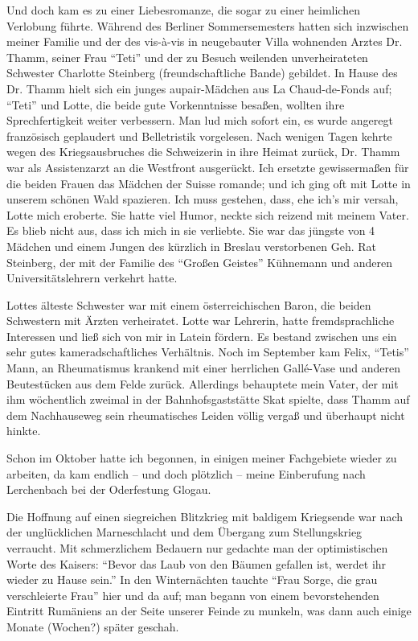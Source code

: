 \documentclass[a5paper,pagesize,10pt,twoside=true]{scrbook}
\begin{document}
Und doch kam es zu einer Liebesromanze, die sogar zu einer heimlichen Verlobung führte. Während des Berliner Sommersemesters hatten sich inzwischen meiner Familie und der des vis-à-vis in neugebauter Villa wohnenden Arztes Dr. Thamm, seiner Frau \enquote{Teti} und der zu Besuch weilenden unverheirateten Schwester Charlotte Steinberg (freundschaftliche Bande) gebildet. In Hause des Dr. Thamm hielt sich ein junges aupair-Mädchen aus La Chaud-de-Fonds auf; \enquote{Teti} und Lotte, die beide gute Vorkenntnisse besaßen, wollten ihre Sprechfertigkeit weiter verbessern. Man lud mich sofort ein, es wurde angeregt französisch geplaudert und Belletristik vorgelesen. Nach wenigen Tagen kehrte wegen des Kriegsausbruches die Schweizerin in ihre Heimat zurück, Dr. Thamm war als Assistenzarzt an die Westfront ausgerückt. Ich ersetzte gewissermaßen für die beiden Frauen das Mädchen der Suisse romande; und ich ging oft mit Lotte in unserem schönen Wald spazieren. Ich muss gestehen, dass, ehe ich's mir versah, Lotte mich eroberte. Sie hatte viel Humor, neckte sich reizend mit meinem Vater. Es blieb nicht aus, dass ich mich in sie verliebte. Sie war das jüngste von 4 Mädchen und einem Jungen des kürzlich in Breslau verstorbenen Geh. Rat Steinberg, der mit der Familie des \enquote{Großen Geistes} Kühnemann und anderen Universitätslehrern verkehrt hatte.

Lottes älteste Schwester war mit einem österreichischen Baron, die beiden Schwestern mit Ärzten verheiratet. Lotte war Lehrerin, hatte fremdsprachliche Interessen und ließ sich von mir in Latein fördern. Es bestand zwischen uns ein sehr gutes kameradschaftliches Verhältnis. Noch im September kam Felix, \enquote{Tetis} Mann, an Rheumatismus krankend mit einer herrlichen Gallé-Vase und anderen Beutestücken aus dem Felde zurück. Allerdings behauptete mein Vater, der mit ihm wöchentlich zweimal in der Bahnhofsgaststätte Skat spielte, dass Thamm auf dem Nachhauseweg sein rheumatisches Leiden völlig vergaß und überhaupt nicht hinkte.

Schon im Oktober hatte ich begonnen, in einigen meiner Fachgebiete wieder zu arbeiten, da kam endlich -- und doch plötzlich -- meine Einberufung nach Lerchenbach bei der Oderfestung Glogau.

Die Hoffnung auf einen siegreichen Blitzkrieg mit baldigem Kriegsende war nach der unglücklichen Marneschlacht und dem Übergang zum Stellungskrieg verraucht. Mit schmerzlichem Bedauern nur gedachte man der optimistischen Worte des Kaisers: \enquote{Bevor das Laub von den Bäumen gefallen ist, werdet ihr wieder zu Hause sein.} In den Winternächten tauchte \enquote{Frau Sorge, die grau verschleierte Frau} hier und da auf; man begann von einem bevorstehenden Eintritt Rumäniens an der Seite unserer Feinde zu munkeln, was dann auch einige Monate (Wochen?) später geschah.
\end{document}
